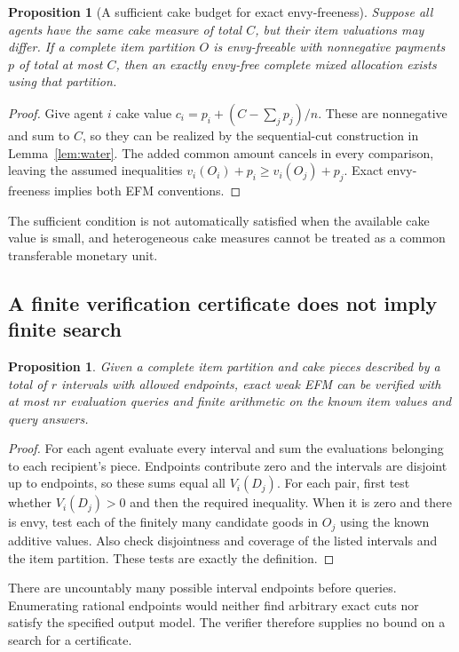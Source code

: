 \documentclass[11pt,a4paper]{article}
\newtheorem{proposition}[theorem]{Proposition}
\theoremstyle{remark}\newtheorem{remark}[theorem]{Remark}
\begin{document}
\begin{proposition}[A sufficient cake budget for exact envy-freeness]\label{prop:paymentsCake}
Suppose all agents have the same cake measure of total $C$, but their item valuations may differ. If a complete item partition $O$ is envy-freeable with nonnegative payments $p$ of total at most $C$, then an exactly envy-free complete mixed allocation exists using that partition.
\end{proposition}
\begin{proof}
Give agent $i$ cake value $c_i=p_i+(C-\sum_jp_j)/n$. These are nonnegative and sum to $C$, so they can be realized by the sequential-cut construction in Lemma~\ref{lem:water}. The added common amount cancels in every comparison, leaving the assumed inequalities $v_i(O_i)+p_i\ge v_i(O_j)+p_j$. Exact envy-freeness implies both EFM conventions.
\end{proof}
The sufficient condition is not automatically satisfied when the available cake value is small, and heterogeneous cake measures cannot be treated as a common transferable monetary unit.

\subsection{A finite verification certificate does not imply finite search}
\begin{proposition}\label{prop:verifyEFM}
Given a complete item partition and cake pieces described by a total of $r$ intervals with allowed endpoints, exact weak EFM can be verified with at most $nr$ evaluation queries and finite arithmetic on the known item values and query answers.
\end{proposition}
\begin{proof}
For each agent evaluate every interval and sum the evaluations belonging to each recipient's piece. Endpoints contribute zero and the intervals are disjoint up to endpoints, so these sums equal all $V_i(D_j)$. For each pair, first test whether $V_i(D_j)>0$ and then the required inequality. When it is zero and there is envy, test each of the finitely many candidate goods in $O_j$ using the known additive values. Also check disjointness and coverage of the listed intervals and the item partition. These tests are exactly the definition.
\end{proof}
There are uncountably many possible interval endpoints before queries. Enumerating rational endpoints would neither find arbitrary exact cuts nor satisfy the specified output model. The verifier therefore supplies no bound on a search for a certificate.
\end{document}
